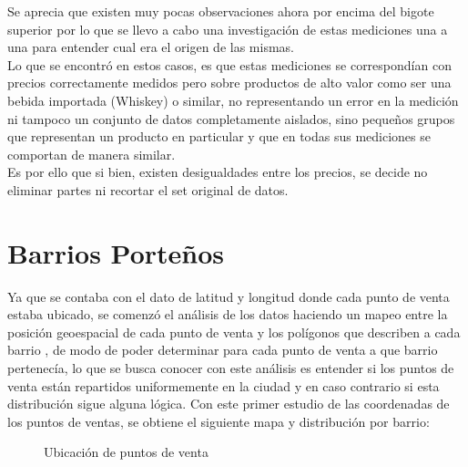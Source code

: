 Se aprecia que existen muy pocas observaciones ahora por encima del bigote superior por lo que se llevo a cabo una investigación de estas mediciones una a una para entender cual era el origen de las mismas.\\
Lo que se encontró en estos casos, es que estas mediciones se correspondían con precios correctamente medidos pero sobre productos de alto valor como ser una bebida importada (Whiskey) o similar, no representando un error en la medición ni tampoco un conjunto de datos completamente aislados, sino pequeños grupos que representan un producto en particular y que en todas sus mediciones se comportan de manera similar.\\
Es por ello que si bien, existen desigualdades entre los precios, se decide no eliminar partes ni recortar el set original de datos.







\section{Barrios Porteños}

Ya que se contaba con el dato de latitud y longitud donde cada punto de venta estaba ubicado, se comenzó el análisis de los datos haciendo un mapeo entre la posición geoespacial de cada punto de venta y los polígonos que describen a cada barrio \cite{barriosGeoJSON}, de modo de poder determinar para cada punto de venta a que barrio pertenecía, lo que se busca conocer con este análisis es entender si los puntos de venta están repartidos uniformemente en la ciudad y en caso contrario si esta distribución sigue alguna lógica. Con este primer estudio de las coordenadas de los puntos de ventas, se obtiene el siguiente mapa y distribución por barrio:

\begin{figure}[h]
\centering
{}%
\caption{Ubicación de puntos de venta}
\label{ptos_venta}
\end{figure}



